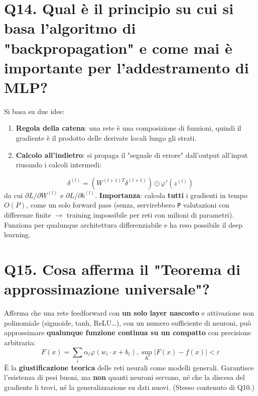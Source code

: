 \documentclass[11pt,a4paper]{article}
\begin{document}
\section*{Q14. Qual è il principio su cui si basa l'algoritmo di "backpropagation" e come mai è importante per l'addestramento di MLP?}
Si basa su due idee:
\begin{enumerate}
\item \textbf{Regola della catena}: una rete è una composizione di funzioni, quindi il gradiente è il prodotto delle derivate locali lungo gli strati.
\item \textbf{Calcolo all'indietro}: si propaga il "segnale di errore" dall'output all'input riusando i calcoli intermedi:
\end{enumerate}
\[ \delta ^{(l)} = (W^{(l+1)T} \delta ^{(l+1)}) \odot  \varphi '(z^{(l)}) \]
da cui $\partial L/\partial W^{(l)}$ e $\partial L/\partial b^{(l)}$.
\textbf{Importanza}: calcola \textbf{tutti} i gradienti in tempo $O(P)$, come un solo forward pass (senza, servirebbero \texttt{P} valutazioni con differenze finite $\to $ training impossibile per reti con milioni di parametri). Funziona per qualunque architettura differenziabile e ha reso possibile il deep learning.
\newpage
\section*{Q15. Cosa afferma il "Teorema di approssimazione universale"?}
Afferma che una rete feedforward con \textbf{un solo layer nascosto} e attivazione non polinomiale (sigmoide, tanh, ReLU…), con un numero sufficiente di neuroni, può approssimare \textbf{qualunque funzione continua su un compatto} con precisione arbitraria:
\[ F(x) = \sum _{i} \alpha _{i} \varphi (w_{i}\cdot x + b_{i}),   \operatorname{sup}_K |F(x) - f(x)| < \varepsilon  \]
È la \textbf{giustificazione teorica} delle reti neurali come modelli generali. Garantisce l'esistenza di pesi buoni, ma \textbf{non} quanti neuroni servano, né che la discesa del gradiente li trovi, né la generalizzazione su dati nuovi. (Stesso contenuto di Q10.)
\newpage
\end{document}
